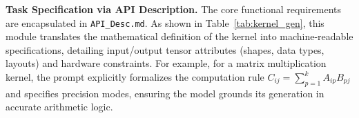 %
\textbf{Task Specification via API Description.} The core functional requirements are encapsulated in \texttt{API\_Desc.md}. As shown in Table~\ref{tab:kernel_gen}, this module translates the mathematical definition of the kernel into machine-readable specifications, detailing input/output tensor attributes (shapes, data types, layouts) and hardware constraints. For example, for a matrix multiplication kernel, the prompt explicitly formalizes the computation rule $C_{ij} = \sum_{p=1}^{k} A_{ip} B_{pj}$ and specifies precision modes, ensuring the model grounds its generation in accurate arithmetic logic.

